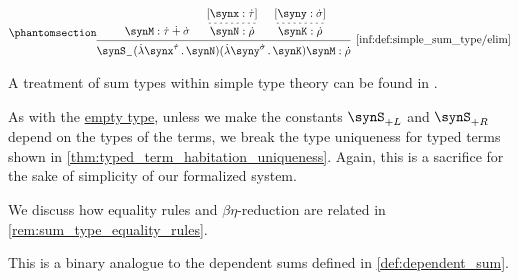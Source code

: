 \begin{definition}
\begin{paracol}{3}
    \begin{nthcolumn}{2}
      \ParacolAlignmentHack
      \begin{equation*}\taglabel[\ensuremath{ +_- }]{inf:def:simple_sum_type/elim}
        \begin{prooftree}
          \hypo{ \synM: \syn\tau \synplus \syn\sigma }
          \hypo{ [\synx: \syn\tau] }
          \infer[dashed]1{ \synN: \syn\rho }
          \hypo{ [\syny: \syn\sigma] }
          \infer[dashed]1{ \synK: \syn\rho }
          \infer3[\ref{inf:def:simple_sum_type/elim}]{ \synS_- (\qabs {\synx^{\syn\tau}} \synN) (\qabs {\syny^{\syn\sigma}} \synK) \synM: \syn\rho }
        \end{prooftree}
      \end{equation*}
    \end{nthcolumn}
  \end{paracol}
  \columnratio{}
\end{definition}
\begin{comments}
  \item A treatment of sum types within simple type theory can be found in \cite[\S 4.3.3]{Mimram2020ProgramEqualsProof}.

  \item As with the \hyperref[def:simple_empty_type]{empty type}, unless we make the constants \( \synS_{+L} \) and \( \synS_{+R} \) depend on the types of the terms, we break the type uniqueness for typed terms shown in \cref{thm:typed_term_habitation_uniqueness}. Again, this is a sacrifice for the sake of simplicity of our formalized system.

  \item We discuss how equality rules and \( \beta\eta \)-reduction are related in \cref{rem:sum_type_equality_rules}.

  \item This is a binary analogue to the dependent sums defined in \cref{def:dependent_sum}.
\end{comments}


